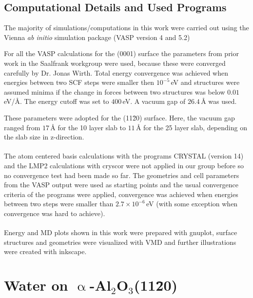 \documentclass[11pt,DIV=13,BCOR=5mm,a4paper,headinclude]{scrbook}
\begin{document}
\section{Computational Details and Used Programs}
The majority of simulations/computations in this work were carried out using the Vienna \textit{ab initio} simulation package (VASP version 4 and 5.2)\cite{kresse1993,kresse2,kresse3,kresse4,kresse99}


For all the VASP calculations for the (0001) surface the parameters from prior work in the Saalfrank workgroup were used, because these were converged carefully by Dr. Jonas Wirth\cite{WirthJPCC2012,Wirth2014,Wirth2015,Wirth2016}.
Total energy convergence was achieved when energies between two SCF steps were smaller then $10^{-5}\,$eV and structures were assumed minima if the change in forces between two structures was below $0.01\,$eV/\AA{}.
The energy cutoff was set to $400\,$eV.
A vacuum gap of $26.4\,$\AA{} was used.


These parameters were adopted for the (11\=20) surface.
Here, the vacuum gap ranged from $17\,$\AA{} for the 10 layer slab to $11\,$\AA{} for the 25 layer slab, depending on the slab size in z-direction.
\\\\

The atom centered basis calculations with the programs CRYSTAL\cite{crystal14} (version 14) and the LMP2 calculations with cryscor\cite{cryscor} were not applied in our group before so no convergence test had been made so far.
The geometries and cell parameters from the VASP output were used as starting points and the usual convergence criteria of the programs were applied, convergence was achieved when energies between two steps were smaller than $2.7\times 10^{-6}\,$eV (with some exception when convergence was hard to achieve).
\\\\

Energy and MD plots shown in this work were prepared with gnuplot\cite{gnuplot}, surface structures and geometries were visualized with VMD\cite{vmd} and further illustrations were created with inkscape\cite{inkscape}.

\chapter{Water on $\upalpha$-Al$_2$O$_3$(11\=20)}
\end{document}
